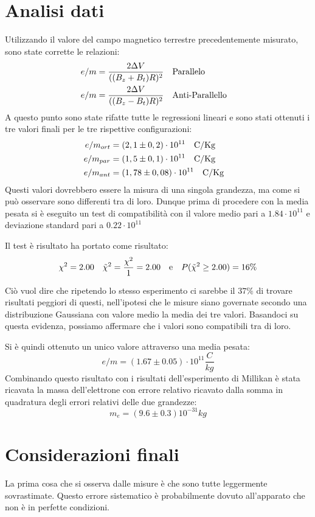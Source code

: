 \documentclass{article}
\begin{document}
\section{Analisi dati}
    Utilizzando il valore del campo magnetico terrestre precedentemente misurato, sono state corrette le relazioni:
    \begin{align*}
        e/m&= \frac{2\Delta V}{((B_z+B_t)R)^2}  \qq{Parallelo}\\
        e/m &= \frac{2\Delta V}{((B_z-B_t)R)^2} \qq{Anti-Parallello}
    \end{align*}
    A questo punto sono state rifatte tutte le regressioni lineari e sono stati ottenuti i tre valori finali per le tre rispettive configurazioni:
        \begin{align*}
            e/m_{ort}&=(2,1 \pm 0,2) \cdot 10^{11} \qq{C/Kg} \\
            e/m_{par} &= (1,5 \pm 0,1) \cdot 10^{11} \qq{C/Kg} \\
            e/m_{ant} &= (1,78 \pm 0,08) \cdot 10^{11} \qq{C/Kg}
        \end{align*}
    Questi valori dovrebbero essere la misura di una singola grandezza, ma come si può osservare sono differenti tra di loro. Dunque prima di procedere con la media pesata si è eseguito un test di compatibilità con il valore medio pari a $1.84\cdot10^{11}$ e deviazione standard pari a $0.22\cdot10^{11}$

    Il test è risultato ha portato come risultato:
    \[\chi^2 = 2.00 \quad \Tilde{\chi}^2= \frac{\chi^2}{1} = 2.00 \qq{e} P(\Tilde{\chi}^2 \ge 2.00) = 16\% \]

    Ciò vuol dire che ripetendo lo stesso esperimento ci sarebbe il $37\%$ di trovare risultati peggiori di questi, nell'ipotesi che le misure siano governate secondo una distribuzione Gaussiana con valore medio la media dei tre valori. Basandoci su questa evidenza, possiamo affermare che i valori sono compatibili tra di loro.
    
    Si è quindi ottenuto un unico valore attraverso una media pesata:
    \[e/m= (1.67\pm0.05)\cdot 10^{11}\frac{C}{kg}\]
    Combinando questo risultato con i risultati dell'esperimento di Millikan è stata ricavata la massa dell'elettrone con errore relativo ricavato dalla somma in quadratura degli errori relativi delle due grandezze:
    \[m_e=(9.6\pm 0.3)10^{-31}kg\]
    
\section{Considerazioni finali}
    La prima cosa che si osserva dalle misure è che sono tutte leggermente sovrastimate. Questo errore sistematico è probabilmente dovuto all'apparato che non è in perfette condizioni. 
\end{document}
